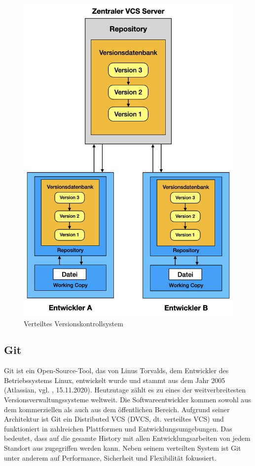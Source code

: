 \begin{itemize}
	\begin{figure}[H]
	\begin{center}
		\includegraphics[scale=.6]{images/distributed_vcs.png}
	\end{center}
		\caption{Verteiltes Versionskontrollsystem}
	\end{figure}
\end{itemize}

\subsection{Git}
Git ist ein Open-Source-Tool, das von Linus Torvalds, dem Entwickler des Betriebssystems Linux, entwickelt wurde und stammt aus dem Jahr 2005 (Atlassian, vgl. \cite{atlassian_git_2020}, 15.11.2020). Heutzutage zählt es zu eines der weitverbreitesten Versionsverwaltungssysteme weltweit. Die Softwareentwickler kommen sowohl aus dem kommerziellen als auch aus dem öffentlichen Bereich. Aufgrund seiner Architektur ist Git ein Distributed VCS (DVCS, dt. verteiltes VCS) und funktioniert in zahlreichen Plattformen und Entwicklungsumgebungen. Das bedeutet, dass auf die gesamte History mit allen Entwicklungsarbeiten von jedem Standort aus zugegriffen werden kann. Neben seinem verteilten System ist Git unter anderem auf Performance, Sicherheit und Flexibilität fokussiert.

